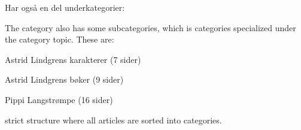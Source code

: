\documentclass[11pt,english,a4paper]{article}
\begin{document}
Har også en del underkategorier: 

The category also has some subcategories, which is categories specialized under the category topic. These are: 

Astrid Lindgrens karakterer (7 sider)

Astrid Lindgrens bøker (9 sider)

Pippi Langstrømpe (16 sider)


  




strict structure where all articles are sorted into categories. 
\end{document}
